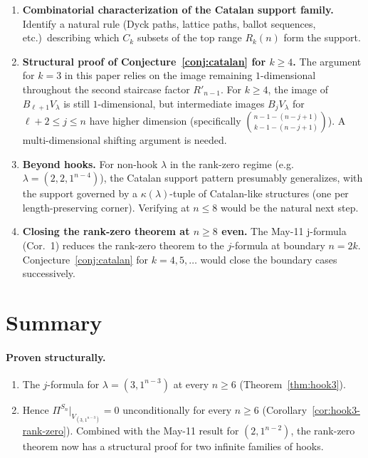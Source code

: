 \documentclass[11pt]{article}
\theoremstyle{definition}
\begin{document}
\begin{enumerate}[leftmargin=2em,topsep=0.3em,itemsep=0.2em]
\item \textbf{Combinatorial characterization of the Catalan support
  family.}  Identify a natural rule (Dyck paths, lattice paths,
  ballot sequences, etc.)\ describing which $C_k$ subsets of the top
  range $R_k(n)$ form the support.

\item \textbf{Structural proof of Conjecture~\ref{conj:catalan} for
  $k\ge 4$.}  The argument for $k=3$ in this paper relies on the image
  remaining $1$-dimensional throughout the second staircase factor
  $R'_{n-1}$.  For $k\ge 4$, the image of $B_{\ell+1}V_\lambda$ is still
  $1$-dimensional, but intermediate images $B_jV_\lambda$ for
  $\ell+2\le j\le n$ have higher dimension (specifically
  $\binom{n-1-(n-j+1)}{k-1-(n-j+1)}$).  A multi-dimensional shifting
  argument is needed.

\item \textbf{Beyond hooks.}  For non-hook $\lambda$ in the rank-zero
  regime (e.g.\ $\lambda=(2,2,1^{n-4})$), the Catalan support pattern
  presumably generalizes, with the support governed by a
  $\kappa(\lambda)$-tuple of Catalan-like structures (one per
  length-preserving corner).  Verifying at $n\le 8$ would be the
  natural next step.

\item \textbf{Closing the rank-zero theorem at $n\ge 8$ even.}  The
  May-11 j-formula (Cor.~1) reduces the rank-zero theorem to the
  $j$-formula at boundary $n=2k$.  Conjecture~\ref{conj:catalan} for
  $k=4,5,\ldots$ would close the boundary cases successively.
\end{enumerate}

\section{Summary}

\paragraph{Proven structurally.}
\begin{enumerate}[leftmargin=2em,topsep=0.3em,itemsep=0.2em]
\item The $j$-formula for $\lambda=(3,1^{n-3})$ at every $n\ge 6$
(Theorem~\ref{thm:hook3}).
\item Hence $\Pi^{S_n}|_{V_{(3,1^{n-3})}}=0$ unconditionally for every
$n\ge 6$ (Corollary~\ref{cor:hook3-rank-zero}).  Combined with the
May-11 result for $(2,1^{n-2})$, the rank-zero theorem now has a
structural proof for two infinite families of hooks.
\end{enumerate}
\end{document}
